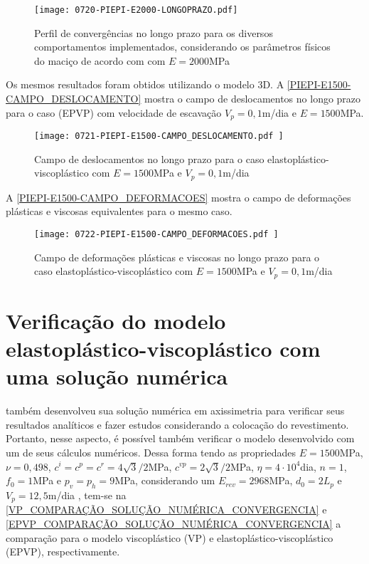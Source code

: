 \begin{figure}[H]
	\begin{center}
		\texttt{[image: 0720-PIEPI-E2000-LONGOPRAZO.pdf]}
	\end{center}
	\caption{\label{PIEPI-E2000-LONGOPRAZO}Perfil de convergências no longo prazo para os diversos comportamentos implementados, considerando os parâmetros físicos do maciço de acordo com  com $E=2000$MPa}
\end{figure}

Os mesmos resultados foram obtidos utilizando o modelo 3D. A \autoref{PIEPI-E1500-CAMPO_DESLOCAMENTO} mostra o campo de deslocamentos no longo prazo para o caso (EPVP) com velocidade de escavação $V_p=0,1$m/dia e $E=1500$MPa.

\begin{figure}[H]
	\begin{center}
		\texttt{[image: 0721-PIEPI-E1500-CAMPO\_DESLOCAMENTO.pdf
		]}
	\end{center}
	\caption{\label{PIEPI-E1500-CAMPO_DESLOCAMENTO}Campo de deslocamentos no longo prazo para o caso elastoplástico-viscoplástico com $E=1500$MPa e $V_p=0,1$m/dia}
\end{figure}

A \autoref{PIEPI-E1500-CAMPO_DEFORMACOES} mostra o campo de deformações plásticas e viscosas equivalentes para o mesmo caso.

\begin{figure}[H]
	\begin{center}
		\texttt{[image: 0722-PIEPI-E1500-CAMPO\_DEFORMACOES.pdf
		]}
	\end{center}
	\caption{\label{PIEPI-E1500-CAMPO_DEFORMACOES}Campo de deformações plásticas e viscosas no longo prazo para o caso elastoplástico-viscoplástico com $E=1500$MPa e $V_p=0,1$m/dia}
\end{figure}

\section{Verificação do modelo elastoplástico-viscoplástico com uma solução numérica}

 também desenvolveu sua solução numérica em axissimetria para verificar seus resultados analíticos e fazer estudos considerando a colocação do revestimento. Portanto, nesse aspecto, é possível também verificar o modelo desenvolvido com um de seus cálculos numéricos. Dessa forma tendo as propriedades $E=1500$MPa, $\nu=0,498$, $c^i=c^p=c^r =4\sqrt{3}/2$MPa, $c^{vp}=2\sqrt{3}/2$MPa, $\eta = 4 \cdot 10^4$dia, $n=1$, $f_0=1$MPa e $p_v=p_h=9$MPa, considerando um $E_{rev} = 2968$MPa, $d_0 = 2L_p$ e $V_p=12,5$m/dia \cite[p. 128, 132]{Piepi1995}, tem-se na \autoref{VP_COMPARAÇÃO_SOLUÇÃO_NUMÉRICA_CONVERGENCIA} e \autoref{EPVP_COMPARAÇÃO_SOLUÇÃO_NUMÉRICA_CONVERGENCIA} a comparação para o modelo viscoplástico (VP) e elastoplástico-viscoplástico (EPVP), respectivamente.

